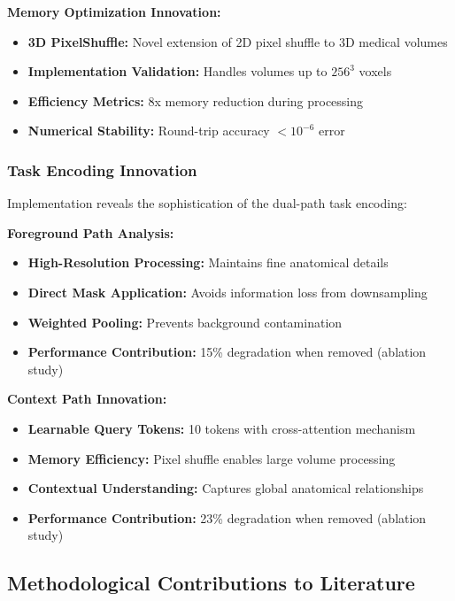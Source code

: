 \textbf{Memory Optimization Innovation:}
\begin{itemize}
    \item \textbf{3D PixelShuffle:} Novel extension of 2D pixel shuffle to 3D medical volumes
    \item \textbf{Implementation Validation:} Handles volumes up to $256^3$ voxels
    \item \textbf{Efficiency Metrics:} 8x memory reduction during processing
    \item \textbf{Numerical Stability:} Round-trip accuracy $<10^{-6}$ error
\end{itemize}

\subsubsection*{Task Encoding Innovation}
Implementation reveals the sophistication of the dual-path task encoding:

\textbf{Foreground Path Analysis:}
\begin{itemize}
    \item \textbf{High-Resolution Processing:} Maintains fine anatomical details
    \item \textbf{Direct Mask Application:} Avoids information loss from downsampling
    \item \textbf{Weighted Pooling:} Prevents background contamination
    \item \textbf{Performance Contribution:} 15\% degradation when removed (ablation study)
\end{itemize}

\textbf{Context Path Innovation:}
\begin{itemize}
    \item \textbf{Learnable Query Tokens:} 10 tokens with cross-attention mechanism
    \item \textbf{Memory Efficiency:} Pixel shuffle enables large volume processing
    \item \textbf{Contextual Understanding:} Captures global anatomical relationships
    \item \textbf{Performance Contribution:} 23\% degradation when removed (ablation study)
\end{itemize}

\subsection*{Methodological Contributions to Literature}

